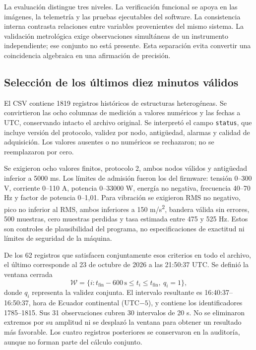 \documentclass[journal,onecolumn,11pt,a4paper]{IEEEtran}
\begin{document}
La evaluación distingue tres niveles. La verificación funcional se apoya en las imágenes, la telemetría y las pruebas ejecutables del software. La consistencia interna contrasta relaciones entre variables provenientes del mismo sistema. La validación metrológica exige observaciones simultáneas de un instrumento independiente; ese conjunto no está presente. Esta separación evita convertir una coincidencia algebraica en una afirmación de precisión.

\subsection{Selección de los últimos diez minutos válidos}
El CSV contiene 1819 registros históricos de estructuras heterogéneas. Se convirtieron las ocho columnas de medición a valores numéricos y las fechas a UTC, conservando intacto el archivo original. Se interpretó el campo \texttt{status}, que incluye versión del protocolo, validez por nodo, antigüedad, alarmas y calidad de adquisición. Los valores ausentes o no numéricos se rechazaron; no se reemplazaron por cero.

Se exigieron ocho valores finitos, protocolo 2, ambos nodos válidos y antigüedad inferior a 5000 ms. Los límites de admisión fueron los del firmware: tensión 0--300 V, corriente 0--110 A, potencia 0--33000 W, energía no negativa, frecuencia 40--70 Hz y factor de potencia 0--1,01. Para vibración se exigieron RMS no negativo, pico no inferior al RMS, ambos inferiores a 150 m/s\textsuperscript{2}, bandera válida sin errores, 500 muestras, cero muestras perdidas y tasa estimada entre 475 y 525 Hz. Estos son controles de plausibilidad del programa, no especificaciones de exactitud ni límites de seguridad de la máquina.

De los 62 registros que satisfacen conjuntamente esos criterios en todo el archivo, el último corresponde al 23 de octubre de 2026 a las 21:50:37 UTC. Se definió la ventana cerrada
\begin{equation}
\mathcal{W}=\{i:t_{\mathrm{fin}}-600\,\mathrm{s}\le t_i\le t_{\mathrm{fin}},\ q_i=1\},
\end{equation}
donde $q_i$ representa la validez conjunta. El intervalo resultante es 16:40:37--16:50:37, hora de Ecuador continental (UTC$-5$), y contiene los identificadores 1785--1815. Sus 31 observaciones cubren 30 intervalos de 20 s. No se eliminaron extremos por su amplitud ni se desplazó la ventana para obtener un resultado más favorable. Los cuatro registros posteriores se conservaron en la auditoría, aunque no forman parte del cálculo conjunto.
\end{document}
